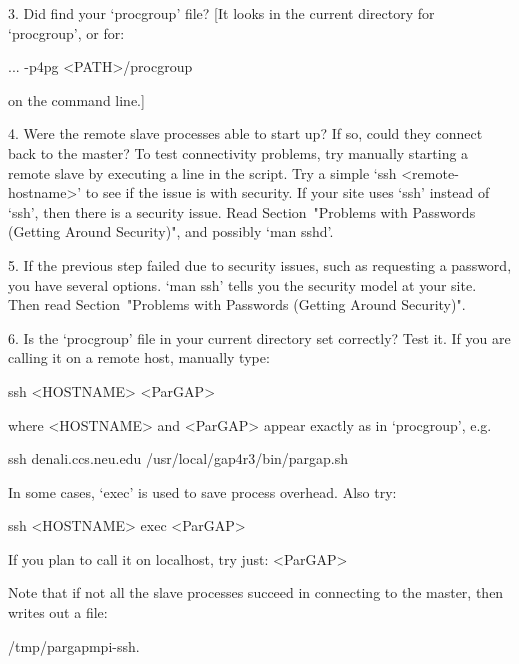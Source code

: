 \item{3.}
    Did {\ParGAP} find your `procgroup' file?
    [It looks in the current directory for `procgroup', or for:

... -p4pg <PATH>/procgroup

\item{}
    on the command line.]

\item{4.}
    Were the remote slave processes able to start up? If so,  could  they
    connect back to  the  master?  To  test  connectivity  problems,  try
    manually starting a remote slave by executing a line in  the  script.
    Try a simple `ssh <remote-hostname>' to see  if  the  issue  is  with
    security. If your site uses `ssh' instead of `ssh', then there  is  a
    security issue. Read Section~"Problems with Passwords (Getting Around
    Security)", and possibly `man sshd'.

\item{5.}
    If  the  previous  step  failed  due  to  security  issues,  such  as
    requesting a password, you have several options. `man ssh' tells  you
    the security model at your site.  Then read Section~"Problems    with
    Passwords  (Getting  Around Security)".

\item{6.}
    Is the `procgroup' file in your current directory set correctly?
    Test it.  If you are calling it on a remote host, manually type:

ssh <HOSTNAME> <ParGAP>

\item{}
    where <HOSTNAME> and <ParGAP> appear exactly as in `procgroup', e.g.
    
ssh denali.ccs.neu.edu /usr/local/gap4r3/bin/pargap.sh

\item{}
    In some cases, `exec' is used to save process overhead. Also try:

ssh <HOSTNAME> exec <ParGAP>

\item{}
    If you plan to call it on localhost, try just:   <ParGAP>

\item{}
    Note that if not all the slave processes succeed in connecting
    to the master, then {\ParGAP} writes out a file:

\begintt
/tmp/pargapmpi-ssh.$$
\endtt
       
